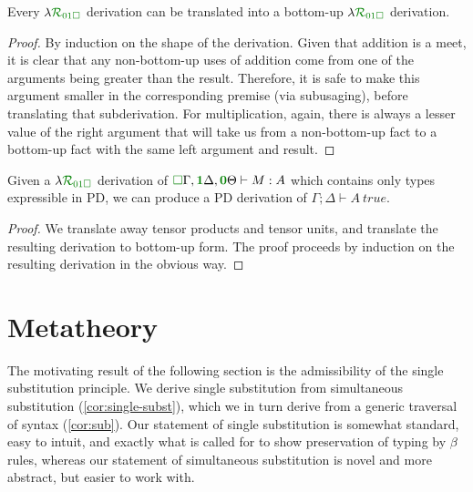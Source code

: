 \documentclass[submission,copyright,creativecommons]{eptcs}
\begin{document}
\begin{lemma}
  Every $\name_{\instPD}$ derivation can be translated into a bottom-up
  $\name_{\instPD}$ derivation.
\end{lemma}
\begin{proof}
  By induction on the shape of the derivation.
  Given that addition is a meet, it is clear that any non-bottom-up uses of
  addition come from one of the arguments being greater than the result.
  Therefore, it is safe to make this argument smaller in the corresponding
  premise (via subusaging), before translating that subderivation.
  For multiplication, again, there is always a lesser value of the right
  argument that will take us from a non-bottom-up fact to a bottom-up fact with
  the same left argument and result.
\end{proof}

\begin{proposition}[\name{} $\to$ PD]
  Given a $\name_{\instPD}$ derivation of
  $\ctx{\Gamma}{\vct\valid}, \ctx{\Delta}{\vct\true}, \ctx{\Theta}{\vct\unused}
  \vdash M : A$ which contains only types expressible in PD, we can produce a
  PD derivation of $\Gamma; \Delta \vdash A~\mathit{true}$.
\end{proposition}
\begin{proof}
  We translate away tensor products and tensor units, and translate the
  resulting derivation to bottom-up form.
  The proof proceeds by induction on the resulting derivation in the obvious
  way.
\end{proof}

\section{Metatheory}\label{sec:metatheory}

The motivating result of the following section is the admissibility of the
single substitution principle.
We derive single substitution from simultaneous substitution
(\autoref{cor:single-subst}), which we in turn derive from a generic traversal
of syntax (\autoref{cor:sub}).
Our statement of single substitution is somewhat standard, easy to intuit, and
exactly what is called for to show preservation of typing by $\beta$ rules,
whereas our statement of simultaneous substitution is novel and more abstract,
but easier to work with.

\end{document}
